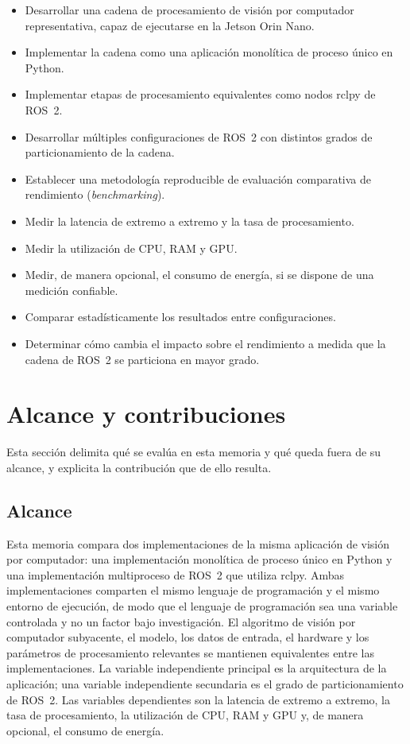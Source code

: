 \begin{itemize}
  \item Desarrollar una cadena de procesamiento de visión por computador
        representativa, capaz de ejecutarse en la Jetson Orin Nano.
  \item Implementar la cadena como una aplicación monolítica de proceso
        único en Python.
  \item Implementar etapas de procesamiento equivalentes como nodos rclpy
        de ROS~2.
  \item Desarrollar múltiples configuraciones de ROS~2 con distintos grados
        de particionamiento de la cadena.
  \item Establecer una metodología reproducible de evaluación comparativa
        de rendimiento (\emph{benchmarking}).
  \item Medir la latencia de extremo a extremo y la tasa de procesamiento.
  \item Medir la utilización de CPU, RAM y GPU.
  \item Medir, de manera opcional, el consumo de energía, si se dispone de
        una medición confiable.
  \item Comparar estadísticamente los resultados entre configuraciones.
  \item Determinar cómo cambia el impacto sobre el rendimiento a medida que
        la cadena de ROS~2 se particiona en mayor grado.
\end{itemize}

\section{Alcance y contribuciones}
\label{sec:scope}

Esta sección delimita qué se evalúa en esta memoria y qué queda fuera de su
alcance, y explicita la contribución que de ello resulta.

\subsection{Alcance}

Esta memoria compara dos implementaciones de la misma aplicación de visión
por computador: una implementación monolítica de proceso único en Python y
una implementación multiproceso de ROS~2 que utiliza rclpy. Ambas
implementaciones comparten el mismo lenguaje de programación y el mismo
entorno de ejecución, de modo que el lenguaje de programación sea una
variable controlada y no un factor bajo investigación. El algoritmo de
visión por computador subyacente, el modelo, los datos de entrada, el
hardware y los parámetros de procesamiento relevantes se mantienen
equivalentes entre las implementaciones. La variable independiente principal
es la arquitectura de la aplicación; una variable independiente secundaria
es el grado de particionamiento de ROS~2. Las variables dependientes son la
latencia de extremo a extremo, la tasa de procesamiento, la utilización de
CPU, RAM y GPU y, de manera opcional, el consumo de energía.

